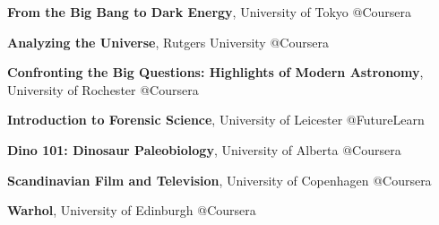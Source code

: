 
\begin{scholarship}
	\scholarshipentry{}
					{\textbf{From the Big Bang to Dark Energy}, University of Tokyo @Coursera}

	\scholarshipentry{}
					{\textbf{\textbf{Analyzing the Universe}}, Rutgers University @Coursera}
					
	\scholarshipentry{}
					{\textbf{Confronting the Big Questions: Highlights of Modern Astronomy}, University of Rochester @Coursera}

	\scholarshipentry{}
	                {\textbf{Introduction to Forensic Science}, University of Leicester @FutureLearn}			

	\scholarshipentry{}
					{\textbf{Dino 101: Dinosaur Paleobiology}, University of Alberta @Coursera}	
					
	\scholarshipentry{}
					{\textbf{Scandinavian Film and Television}, University of Copenhagen @Coursera}
					
	\scholarshipentry{}
					{\textbf{Warhol}, University of Edinburgh @Coursera}	
					
  \emptySeparator					
\end{scholarship}